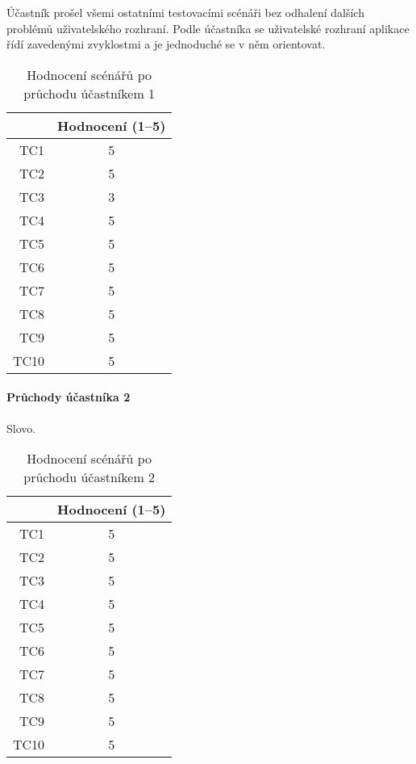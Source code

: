 Účastník prošel všemi ostatními testovacími scénáři bez odhalení dalších problémů uživatelského rozhraní.
Podle účastníka se uživatelské rozhraní aplikace řídí zavedenými zvyklostmi a je jednoduché se v něm orientovat.

\begin{table}[ht!]
    \centering
    \caption{Hodnocení scénářů po průchodu účastníkem 1}
    \label{tab:poPrůchoduÚčastníkem1}
    \begin{tabular}{r|c}
        & Hodnocení (1--5) \\ \hline
        TC1 & 5 \\
        TC2 & 5 \\
        TC3 & 3 \\
        TC4 & 5 \\
        TC5 & 5 \\
        TC6 & 5 \\
        TC7 & 5 \\
        TC8 & 5 \\
        TC9 & 5 \\
        TC10 & 5 \\
    \end{tabular}
\end{table}


\paragraph{Průchody účastníka 2} Slovo.

\begin{table}[ht!]
    \centering
    \caption{Hodnocení scénářů po průchodu účastníkem 2}
    \label{tab:poPrůchoduÚčastníkem2}
    \begin{tabular}{r|c}
        & Hodnocení (1--5) \\ \hline
        TC1 & 5 \\
        TC2 & 5 \\
        TC3 & 5 \\
        TC4 & 5 \\
        TC5 & 5 \\
        TC6 & 5 \\
        TC7 & 5 \\
        TC8 & 5 \\
        TC9 & 5 \\
        TC10 & 5 \\
    \end{tabular}
\end{table}

